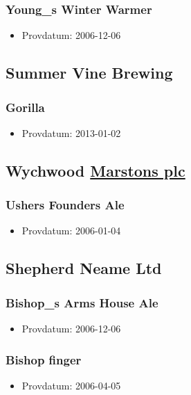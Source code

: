 \documentclass[11pt]{article}
\begin{document}
\subsubsection{Young\_s Winter Warmer}
\label{sec:org113b2ab}
\begin{itemize}
\item Provdatum: 2006-12-06
\end{itemize}
\subsection{Summer Vine Brewing}
\label{sec:org895887c}
\subsubsection{Gorilla}
\label{sec:orgbeacd78}
\begin{itemize}
\item Provdatum: 2013-01-02
\end{itemize}
\subsection{Wychwood \underline{Marstons plc}}
\label{sec:org84c834b}
\subsubsection{Ushers Founders Ale}
\label{sec:org22e558b}
\begin{itemize}
\item Provdatum: 2006-01-04
\end{itemize}
\subsection{Shepherd Neame Ltd}
\label{sec:org2b28559}
\subsubsection{Bishop\_s Arms House Ale}
\label{sec:org9100a76}
\begin{itemize}
\item Provdatum: 2006-12-06
\end{itemize}
\subsubsection{Bishop finger}
\label{sec:orgf57aad4}
\begin{itemize}
\item Provdatum: 2006-04-05
\end{itemize}
\end{document}
